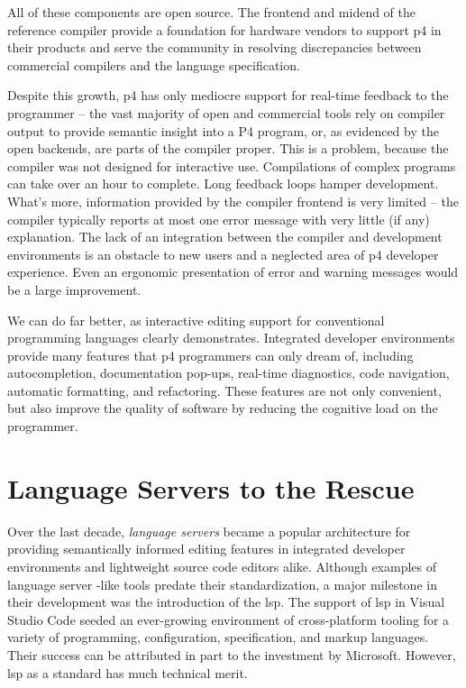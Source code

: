 All of these components are open source. The frontend and mid\-end of the
reference compiler provide a foundation for hardware vendors to support
\acrshort{p4} in their products and serve the community in resolving
discrepancies between commercial compilers and the language specification.

Despite this growth, \acrshort{p4} has only mediocre support for real-time
feedback to the programmer -- the vast majority of open and commercial tools
rely on compiler output to provide semantic insight into a P4
program\cite{p4insight}, or, as evidenced by the open backends, are parts of the
compiler proper. This is a problem, because the compiler was not designed for
interactive use. Compilations of complex programs can take over an hour to
complete. Long feedback loops hamper development. What's more, information
provided by the compiler frontend is very limited -- the compiler typically
reports at most one error message with very little (if any) explanation. The
lack of an integration between the compiler and development environments is an
obstacle to new users and a neglected area of \acrshort{p4} developer
experience. Even an ergonomic presentation of error and warning messages would
be a large improvement.

We can do far better, as interactive editing support for conventional
programming languages clearly demonstrates. Integrated developer environments
provide many features that \acrshort{p4} programmers can only dream of,
including autocompletion, documentation pop-ups, real-time diagnostics, code
navigation, automatic formatting, and refactoring. These features are not only
convenient, but also improve the quality of software by reducing the cognitive
load on the programmer.

\section*{Language Servers to the Rescue}

Over the last decade, \emph{language servers} became a popular
architecture\cite{barros2022editing} for providing semantically informed editing
features in integrated developer environments and lightweight source code
editors alike. Although examples of language server -like tools predate their
standardization\cite{bour2018merlin}, a major milestone in their development was
the introduction of the \acrfull{lsp}. The support of \acrshort{lsp} in Visual
Studio Code seeded an ever-growing environment of cross-platform tooling for a
variety of programming, configuration, specification, and markup languages.
Their success can be attributed in part to the investment by Microsoft. However,
\acrshort{lsp} as a standard has much technical merit.

